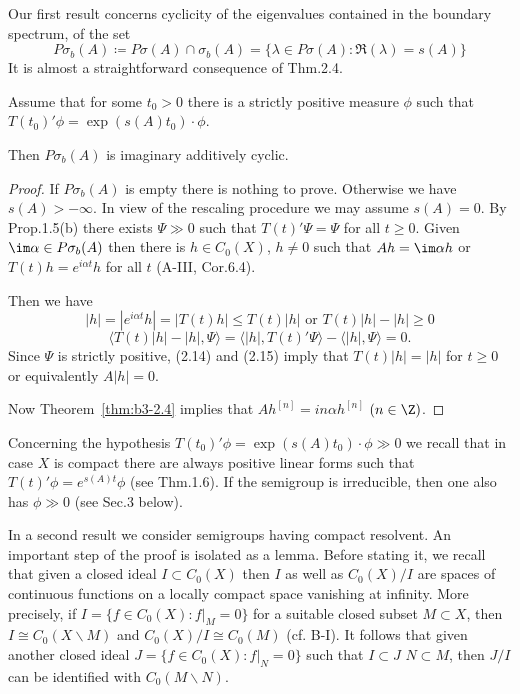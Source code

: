 Our first result concerns cyclicity of the eigenvalues contained in the boundary spectrum, \ie of the set
	\[
	P\sigma_{b}(A) \coloneqq P\sigma(A) \cap \sigma_{b}(A) = \{\lambda \in P\sigma(A) \colon \Re(\lambda) = s(A)\}
	\]
	It is almost a straightforward consequence of Thm.2.4.
	\begin{proposition}\label{prop:b3-2.7}
		
		Assume that for some $t_{0} > 0$ there is a strictly positive measure $\phi$ such that $T(t_{0})'\phi = \exp(s(A)t_{0})\cdot\phi$.
		
		Then $P\sigma_{b}(A)$ is imaginary additively cyclic.
	\end{proposition}
\begin{proof}
	If $P\sigma_{b}(A)$ is empty there is nothing to prove.
	Otherwise we have $s(A) > -\infty$.
	In view of the rescaling procedure we may assume $s(A) = 0$.
	By Prop.1.5(b) there exists $\Psi \gg 0$ such that $T(t)'\Psi = \Psi$ for all $t \geq 0$.
	Given $\im \alpha \in P\sigma_{b}(A)$ then there is $h \in C_{0}(X)$, $h \neq 0$ such that $Ah = \im\alpha h$ or $T(t)h = e^{i\alpha t}h$ for all $t$ (A-III, Cor.6.4).
			
\newpage
	Then we have
	\begin{equation}\label{eq:b3-2.14}
		|h| = |e^{i\alpha t}h| = |T(t)h| \leq T(t)|h| \text{ or } T(t)|h| - |h| \geq 0
	\end{equation}
	\begin{equation}\label{eq:b3-2.15}
		\langle T(t)|h| - |h|,\Psi \rangle = \langle |h|,T(t)'\Psi \rangle - \langle |h|,\Psi \rangle = 0.
	\end{equation}
	Since $\Psi$ is strictly positive, (2.14) and (2.15) imply that $T(t)|h| = |h|$ for $t \geq 0$ or equivalently $A|h| = 0$.
	
	Now Theorem~\ref{thm:b3-2.4} implies that $Ah^{[n]} = in\alpha h^{[n]}$ $(n \in \Z)$.
\end{proof}
Concerning the hypothesis $T(t_{0})'\phi = \exp(s(A)t_{0})\cdot\phi \gg 0$ we recall that in case $X$ is compact there are always positive linear forms such that $T(t)'\phi = e^{s(A)t}\phi$ (see Thm.1.6).
If the semigroup is irreducible, then one also has $\phi \gg 0$ (see Sec.3 below).

In a second result we consider semigroups having compact resolvent.
An important step of the proof is isolated as a lemma.
Before stating it, we recall that given a closed ideal $I \subset C_{0}(X)$ then $I$ as well as $C_{0}(X)/I$ are spaces of continuous functions on a locally compact space vanishing at infinity.
More precisely, if $I = \{f \in C_{0}(X) \colon f|_{M} = 0\}$ for a suitable closed subset $M \subset X$, then $I \cong C_{0}(X\backslash M)$ and $C_{0}(X)/I \cong C_{0}(M)$ (cf. B-I).
It follows that given another closed ideal $J = \{f \in C_{0}(X) \colon f|_{N} = 0\}$ such that $I \subset J$ \ie $N \subset M$, then $J/I$ can be identified with $C_{0}(M\backslash N)$.

